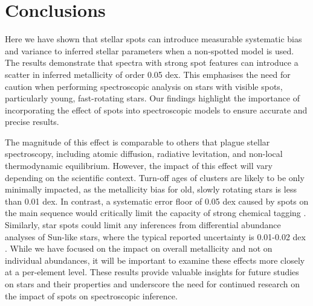 

\section{Conclusions}
\label{sec:conclusions}

Here we have shown that stellar spots can introduce measurable systematic bias and variance to inferred stellar parameters when a non-spotted model is used. The results demonstrate that spectra with strong spot features can introduce a scatter in inferred metallicity of order 0.05 dex. This emphasises the need for caution when performing spectroscopic analysis on stars with visible spots, particularly young, fast-rotating stars. Our findings highlight the importance of incorporating the effect of spots into spectroscopic models to ensure accurate and precise results. 

The magnitude of this effect is comparable to others that plague stellar spectroscopy, including atomic diffusion, radiative levitation, and non-local thermodynamic equilibrium. However, the impact of this effect will vary depending on the scientific context. Turn-off ages of clusters are likely to be only minimally impacted, as the metallicity bias for old, slowly rotating stars is less than 0.01 dex. In contrast, a systematic error floor of 0.05 dex caused by spots on the main sequence would critically limit the capacity of strong chemical tagging \citep{casamiquela_impossibility_2021}. Similarly, star spots could limit any inferences from differential abundance analyses of Sun-like stars, where the typical reported uncertainty is 0.01-0.02 dex \citep[e.g.,][]{nissen_high-precision_2015}. While we have focused on the impact on overall metallicity and not on individual abundances, it will be important to examine these effects more closely at a per-element level. These results provide valuable insights for future studies on stars and their properties and underscore the need for continued research on the impact of spots on spectroscopic inference. 